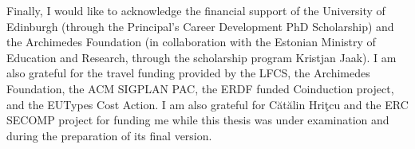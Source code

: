 \documentclass[phd,lfcs,twoside,logo]{infthesis}
\theoremstyle{definition}
\begin{document}
\begin{preliminary}
\begin{acknowledgements}
Finally, I would like to acknowledge the financial support of the University of Edinburgh (through the Principal's Career Development PhD Scholarship) and the Archimedes Foundation (in collaboration with the Estonian Ministry of Education and Research, through the scholarship program Kristjan Jaak). I am also grateful for the travel funding provided by the LFCS, the Archimedes Foundation, the ACM SIGPLAN PAC, the ERDF funded Coinduction project, and the EUTypes Cost Action. I am also grateful for C\u{a}t\u{a}lin Hri\c{t}cu and the ERC SECOMP project for funding me while this thesis was under examination  and during the preparation of its final version.
\end{acknowledgements}

\standarddeclaration


\tableofcontents


\end{preliminary}


%
% 

















\appendix





\end{document}
